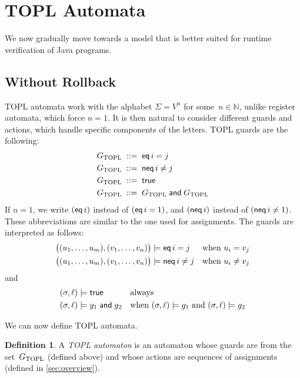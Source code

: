 \documentclass[9pt, preprint]{sigplanconf} %
\newcommand{\N}{\ensuremath{\mathbb{N}}}
\theoremstyle{definition}
\newtheorem{definition}{Definition}
\theoremstyle{remark}
\begin{document}
\section{TOPL Automata}\label{sec:topl_automata} %

We now gradually move towards a model that is better suited for runtime verification of Java programs.

\subsection{Without Rollback} %

TOPL automata work with the alphabet $\Sigma=V^n$ for some~$n\in\N$, unlike register automata, which force $n=1$.
It is then natural to consider different guards and actions, which handle specific components of the letters.
TOPL guards are the following:
\begin{align*}
G_{\rm TOPL} &\;::=\; {\sf eq}\,i=j \\
G_{\rm TOPL} &\;::=\; {\sf neq}\,i\ne j \\
G_{\rm TOPL} &\;::=\; {\sf true} \\
G_{\rm TOPL} &\;::=\; G_{\rm TOPL} \mathrel{\sf and} G_{\rm TOPL}
\end{align*}
If $n=1$, we write $({\sf eq}\,i)$ instead of $({\sf eq}\,i=1)$, and $({\sf neq}\,i)$ instead of $({\sf neq}\,i\ne1)$.
These abbreviations are similar to the one used for assignments.
The guards are interpreted as follows:
\begin{align*}
\bigl((u_1,\ldots,u_m),(v_1,\ldots,v_n)\bigr) &\models {\sf eq}\,i=j
  &&\text{when $u_i=v_j$} \\
\bigl((u_1,\ldots,u_m),(v_1,\ldots,v_n)\bigr) &\models {\sf neq}\,i\ne j
  &&\text{when $u_i\ne v_j$}
\end{align*}
and
\begin{align*}
(\sigma,\ell) &\models {\sf true}
  &&\text{always} \\
(\sigma,\ell) &\models g_1\mathrel{\sf and} g_2
  &&\text{when $(\sigma,\ell)\models g_1$ and $(\sigma,\ell)\models g_2$}
\end{align*}

We can now define TOPL automata.

\begin{definition}
A \emph{TOPL automaton} is an automaton whose guards are from the set~$G_{\rm TOPL}$ (defined above) and whose actions are sequences of assignments (defined in \autoref{sec:overview}).
\end{definition}
\end{document}
